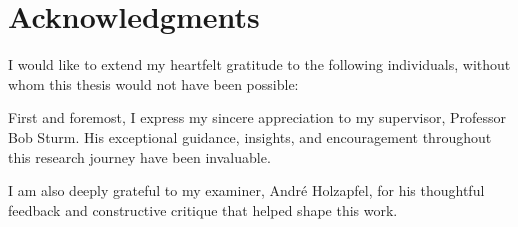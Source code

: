 \chapter*{Acknowledgments}

I would like to extend my heartfelt gratitude to the following individuals, without whom this thesis would not have been possible:

First and foremost, I express my sincere appreciation to my supervisor, Professor Bob Sturm. His exceptional guidance, insights, and encouragement throughout this research journey have been invaluable.

I am also deeply grateful to my examiner, Andr\'{e} Holzapfel, for his thoughtful feedback and constructive critique that helped shape this work.


\clearpage
